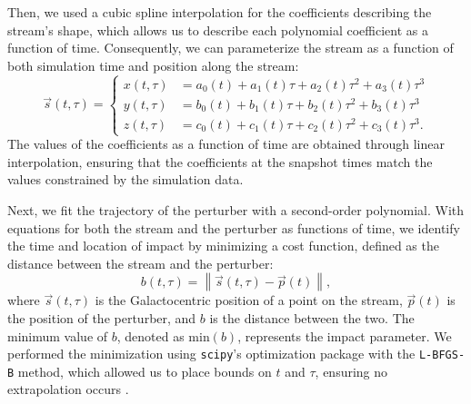 \documentclass{aa}
\begin{document}
\begin{appendix}
      Then, we used a cubic spline interpolation for the coefficients describing the stream's shape, which allows us to describe each polynomial coefficient as a function of time. Consequently, we can parameterize the stream as a function of both simulation time and position along the stream:
      \begin{equation}
        \vec{s}(t,\tau) = 
        \left\{
        \begin{aligned}
          x(t,\tau) &= a_0(t) + a_1(t)\tau + a_2(t) \tau^2 + a_3(t)\tau^3 \\ 
          y(t,\tau) &= b_0(t) + b_1(t)\tau + b_2(t) \tau^2 + b_3(t)\tau^3 \\
          z(t,\tau) &= c_0(t) + c_1(t)\tau + c_2(t) \tau^2 + c_3(t)\tau^3.
          \end{aligned}
        \right.
      \end{equation}
      The values of the coefficients as a function of time are obtained through linear interpolation, ensuring that the coefficients at the snapshot times match the values constrained by the simulation data.

      Next, we fit the trajectory of the perturber with a second-order polynomial. With equations for both the stream and the perturber as functions of time, we identify the time and location of impact by minimizing a cost function, defined as the distance between the stream and the perturber:
      \begin{equation} 
        b(t, \tau) = \left\lVert \vec{s}(t, \tau) - \vec{p}(t) \right\rVert, 
        \end{equation}
      where $\vec{s}(t, \tau)$ is the Galactocentric position of a point on the stream, $\vec{p}(t)$ is the position of the perturber, and $b$ is the distance between the two. The minimum value of $b$, denoted as $\text{min}(b)$, represents the impact parameter. We performed the minimization using \texttt{scipy}'s optimization package with the \texttt{L-BFGS-B} method, which allowed us to place bounds on $t$ and $\tau$, ensuring no extrapolation occurs \citep{davidon1991variable}.


\end{appendix}
\end{document}

